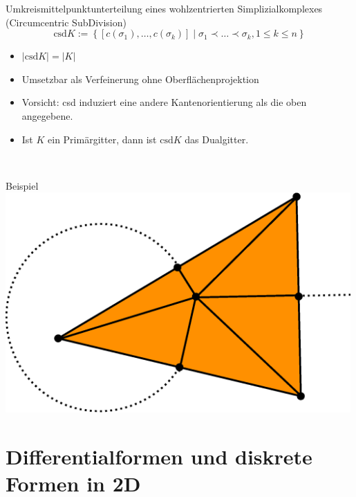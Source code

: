 \documentclass{beamer}
\begin{document}
  \begin{frame}
    \begin{block}{Umkreismittelpunktunterteilung eines wohlzentrierten Simplizialkomplexes (Circumcentric SubDivision)}
      \[ \text{csd}K := \left\{ \left[c(\sigma_{1}),\ldots,c(\sigma_{k})\right] \middle| \sigma_{1} \prec \ldots \prec \sigma_{k}, 1 \le k \le n \right\} \]
    \end{block}
    \begin{minipage}{0.5\textwidth}
      \begin{itemize}
        \item \( |\text{csd}K| = |K| \)
        \item Umsetzbar als Verfeinerung ohne Oberflächenprojektion
        \item Vorsicht: csd induziert eine andere Kantenorientierung als die oben angegebene.
        \item Ist \( K \) ein Primärgitter, dann ist \( \text{csd}K \) das Dualgitter.
      \end{itemize}
    \end{minipage} \, 
    \begin{minipage}{0.45\textwidth}
      \begin{block}{Beispiel}
        \centering\includegraphics[width=0.99\textwidth]{bilder/inkscape/subdivision2.eps}
      \end{block}
    \end{minipage}
  \end{frame}

  
  \section{Differentialformen und diskrete Formen in 2D}
\end{document}
